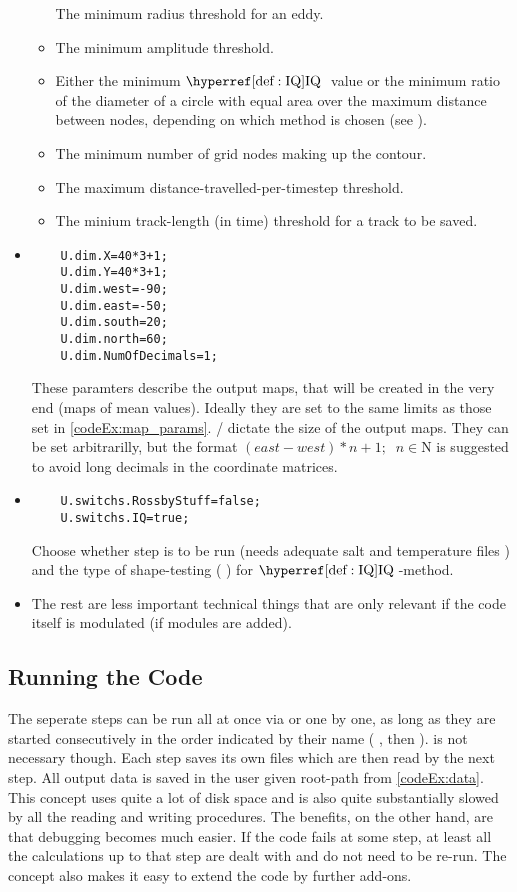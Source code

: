 \begin{itemize}
\begin{itemize}
	The minimum radius threshold for an eddy.
	\item
	The minimum amplitude threshold.
	\item
	Either the minimum $\IQ$ value or the minimum ratio of the diameter of a
circle	 with equal area over the maximum distance between nodes, depending on
which	 method is chosen (see ). 
	\item
	The minimum number of grid nodes making up the contour.
	\item
	The maximum distance-travelled-per-timestep threshold.
	\item
	The minium track-length (in time) threshold for a track to be saved.
	\end{itemize}
\item

\begin{lstlisting}
	U.dim.X=40*3+1;
	U.dim.Y=40*3+1;
	U.dim.west=-90;
	U.dim.east=-50;
	U.dim.south=20;
	U.dim.north=60;
	U.dim.NumOfDecimals=1;
\end{lstlisting}
These paramters describe the output maps, that will be created in the very end
(\eg maps of mean values). Ideally they are set to the same limits as
those set in \ref{codeEx:map_params}. / dictate
the size of the output maps. They can be set arbitrarilly, but the format \eg
$(east-west)*n +1; \;\; n \in \mathrm{N}$ is suggested to avoid long decimals in
the coordinate matrices.
\item
\begin{lstlisting}
	U.switchs.RossbyStuff=false;
	U.switchs.IQ=true;	
\end{lstlisting}
Choose whether step  is to be run (needs adequate
salt and temperature files ) and the type of shape-testing (
) for $\IQ$-method.
\item
The rest are less important technical things that are only relevant if the code
itself is modulated (\eg if modules are added).
\end{itemize}

\subsection{Running the Code}
The seperate steps can be run all at once via  or one by one, as
long as they are started consecutively in the order indicated by their name
( , then  \etc).  is not necessary
though. Each step saves its own files which are then read by the next step.
All output data is saved in the user given root-path from \ref{codeEx:data}.
This concept uses quite a lot of disk space and is also quite substantially
slowed by all the reading and writing procedures. The benefits, on the other
hand, are that debugging becomes much easier. If the code fails at some step,
at least all the calculations up to that step are dealt with and do not need to
be re-run. The concept also makes it easy to extend the code by further
add-ons.

